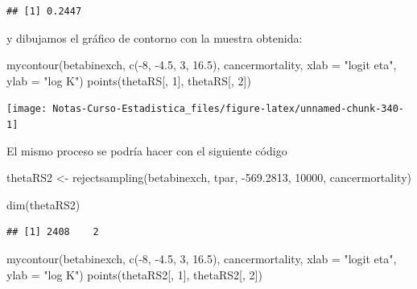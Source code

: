 \documentclass[
  12pt,
]{book}
\newenvironment{Shaded}{\begin{snugshade}}{\end{snugshade}}
\newcommand{\AttributeTok}[1]{\textcolor[rgb]{0.77,0.63,0.00}{#1}}
\newcommand{\DecValTok}[1]{\textcolor[rgb]{0.00,0.00,0.81}{#1}}
\newcommand{\FloatTok}[1]{\textcolor[rgb]{0.00,0.00,0.81}{#1}}
\newcommand{\FunctionTok}[1]{\textcolor[rgb]{0.00,0.00,0.00}{#1}}
\newcommand{\NormalTok}[1]{#1}
\newcommand{\OtherTok}[1]{\textcolor[rgb]{0.56,0.35,0.01}{#1}}
\newcommand{\SpecialCharTok}[1]{\textcolor[rgb]{0.00,0.00,0.00}{#1}}
\newcommand{\StringTok}[1]{\textcolor[rgb]{0.31,0.60,0.02}{#1}}
\theoremstyle{definition}
\theoremstyle{definition}
\theoremstyle{definition}
\theoremstyle{definition}
\theoremstyle{remark}
\begin{document}
\begin{verbatim}
## [1] 0.2447
\end{verbatim}

y dibujamos el gráfico de contorno con la muestra obtenida:

\begin{Shaded}
\begin{Highlighting}[]
\FunctionTok{mycontour}\NormalTok{(betabinexch, }\FunctionTok{c}\NormalTok{(}\SpecialCharTok{{-}}\DecValTok{8}\NormalTok{, }\SpecialCharTok{{-}}\FloatTok{4.5}\NormalTok{, }\DecValTok{3}\NormalTok{, }\FloatTok{16.5}\NormalTok{), cancermortality,}
    \AttributeTok{xlab =} \StringTok{"logit eta"}\NormalTok{, }\AttributeTok{ylab =} \StringTok{"log K"}\NormalTok{)}
\FunctionTok{points}\NormalTok{(thetaRS[, }\DecValTok{1}\NormalTok{], thetaRS[, }\DecValTok{2}\NormalTok{])}
\end{Highlighting}
\end{Shaded}

\begin{center}\texttt{[image: Notas-Curso-Estadistica\_files/figure-latex/unnamed-chunk-340-1]} \end{center}

El mismo proceso se podría hacer con el siguiente código

\begin{Shaded}
\begin{Highlighting}[]
\NormalTok{thetaRS2 }\OtherTok{\textless{}{-}} \FunctionTok{rejectsampling}\NormalTok{(betabinexch, tpar, }\SpecialCharTok{{-}}\FloatTok{569.2813}\NormalTok{,}
    \DecValTok{10000}\NormalTok{, cancermortality)}

\FunctionTok{dim}\NormalTok{(thetaRS2)}
\end{Highlighting}
\end{Shaded}

\begin{verbatim}
## [1] 2408    2
\end{verbatim}

\begin{Shaded}
\begin{Highlighting}[]
\FunctionTok{mycontour}\NormalTok{(betabinexch, }\FunctionTok{c}\NormalTok{(}\SpecialCharTok{{-}}\DecValTok{8}\NormalTok{, }\SpecialCharTok{{-}}\FloatTok{4.5}\NormalTok{, }\DecValTok{3}\NormalTok{, }\FloatTok{16.5}\NormalTok{), cancermortality,}
    \AttributeTok{xlab =} \StringTok{"logit eta"}\NormalTok{, }\AttributeTok{ylab =} \StringTok{"log K"}\NormalTok{)}
\FunctionTok{points}\NormalTok{(thetaRS2[, }\DecValTok{1}\NormalTok{], thetaRS2[, }\DecValTok{2}\NormalTok{])}
\end{Highlighting}
\end{Shaded}
\end{document}
